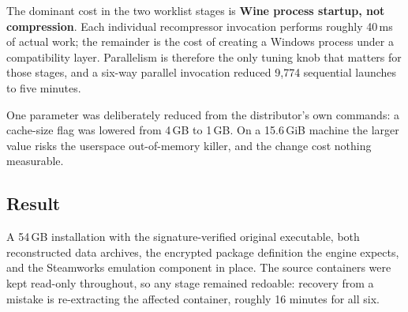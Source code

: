 The dominant cost in the two worklist stages is \textbf{Wine process startup, not
compression}. Each individual recompressor invocation performs roughly 40\,ms of
actual work; the remainder is the cost of creating a Windows process under a
compatibility layer. Parallelism is therefore the only tuning knob that matters
for those stages, and a six-way parallel invocation reduced 9{,}774 sequential
launches to five minutes.

One parameter was deliberately reduced from the distributor's own commands: a
cache-size flag was lowered from 4\,GB to 1\,GB. On a 15.6\,GiB machine the
larger value risks the userspace out-of-memory killer, and the change cost
nothing measurable.

\subsection{Result}

A 54\,GB installation with the signature-verified original executable, both
reconstructed data archives, the encrypted package definition the engine expects,
and the Steamworks emulation component in place. The source containers were kept
read-only throughout, so any stage remained redoable: recovery from a mistake is
re-extracting the affected container, roughly 16 minutes for all six.
